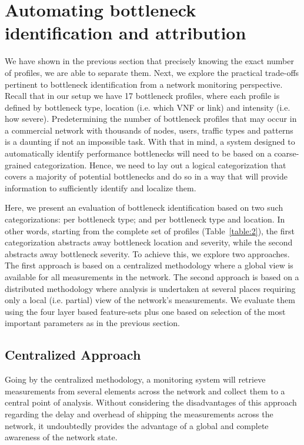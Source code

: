 \documentclass[journal,comsoc]{IEEEtran}
\begin{document}
\section{Automating bottleneck identification and attribution}
\label{sec:bottlenecks}

%
We have shown in the previous section that precisely knowing the exact number of profiles, we are able to separate them. Next, we explore the practical trade-offs pertinent to bottleneck identification from a network monitoring perspective.
Recall that in our setup we have 17 bottleneck profiles, where each profile is defined by bottleneck type, location (i.e. which VNF or link) and intensity (i.e. how severe).
Predetermining the number of bottleneck profiles that may occur in a commercial network with thousands of nodes, users, traffic types and patterns is a daunting if not an impossible task.
With that in mind, a system designed to automatically identify performance bottlenecks will need to be based on a coarse-grained categorization.
Hence, we need to lay out a logical categorization that covers a majority of potential bottlenecks and do so in a way that will provide information to sufficiently identify and localize them.

%
Here, we present an evaluation of bottleneck identification based on two such categorizations: per bottleneck type; and per bottleneck type and location.
In other words, starting from the complete set of profiles (Table~\ref{table:2}), the first categorization abstracts away bottleneck location and severity, while the second abstracts away bottleneck severity.
To achieve this, we explore two approaches.
The first approach is based on a centralized methodology where a global view is available for all measurements in the network. The second approach is based on a distributed methodology where analysis is undertaken at several places requiring only a local (i.e. partial) view of the network's measurements.
We evaluate them using the four layer based feature-sets plus one based on selection of the most important parameters as in the previous section.

%
\subsection{Centralized Approach}
\label{sec:bottlenecks_1step}

%
Going by the centralized methodology, a monitoring system will retrieve measurements from several elements across the network and collect them to a central point of analysis.
Without considering the disadvantages of this approach regarding the delay and overhead of shipping the measurements across the network, it undoubtedly provides the advantage of a global and complete awareness of the network state.
\end{document}
